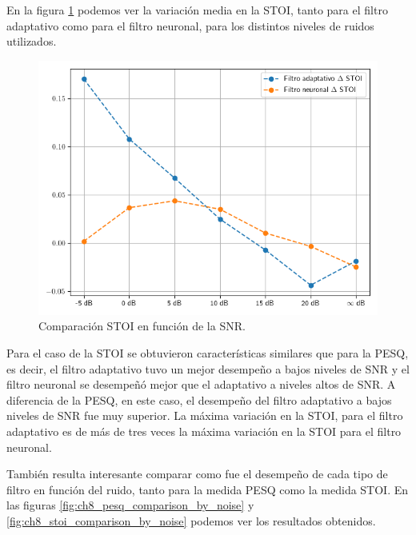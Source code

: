 En la figura \ref{fig:ch8_stoi_comparison} podemos ver la variación media en la STOI, tanto para el filtro adaptativo como para el filtro neuronal, para los distintos niveles de ruidos utilizados.

\begin{figure}
	\centering
	\centerline{\includegraphics[scale=0.75]{images/ch8/comparison_stoi.png}}
	\caption{Comparación STOI en función de la SNR.}
	\label{fig:ch8_stoi_comparison}
\end{figure}

Para el caso de la STOI se obtuvieron características similares que para la PESQ, es decir, el filtro adaptativo tuvo un mejor desempeño a bajos niveles de SNR y el filtro neuronal se desempeñó mejor que el adaptativo a niveles altos de SNR. A diferencia de la PESQ, en este caso, el desempeño del filtro adaptativo a bajos niveles de SNR fue muy superior. La máxima variación en la STOI, para el filtro adaptativo es de más de tres veces la máxima variación en la STOI para el filtro neuronal.

También resulta interesante comparar como fue el desempeño de cada tipo de filtro en función del ruido, tanto para la medida PESQ como la medida STOI. En las figuras \ref{fig:ch8_pesq_comparison_by_noise} y \ref{fig:ch8_stoi_comparison_by_noise} podemos ver los resultados obtenidos.

